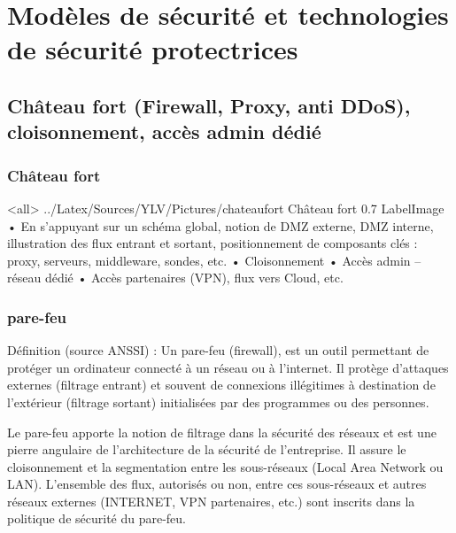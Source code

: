 \section{Modèles de sécurité et technologies de sécurité protectrices}
\subsection{Château fort (Firewall, Proxy, anti DDoS), cloisonnement, accès admin dédié}
\subsubsection{Château fort}


\mode<all>{\picframe
{../Latex/Sources/YLV/Pictures/chateaufort}%
{Château fort} %
{0.7} %
{LabelImage} %
}
•	En s’appuyant sur un schéma global, notion de DMZ externe, DMZ interne, illustration des flux entrant et sortant, positionnement de composants clés : proxy, serveurs, middleware, sondes, etc.
•	Cloisonnement
•	Accès admin – réseau dédié
•	Accès partenaires (VPN), flux vers Cloud, etc.
\subsubsection{pare-feu}
Définition (source ANSSI) :
Un pare-feu (firewall), est un outil permettant de protéger un ordinateur connecté à un réseau ou à l’internet. Il protège d’attaques externes (filtrage entrant) et souvent de connexions illégitimes à destination de l’extérieur (filtrage sortant) initialisées par des programmes ou des personnes.

Le pare-feu apporte la notion de filtrage dans la sécurité des réseaux et est une pierre angulaire de l'architecture de la sécurité de l'entreprise.
Il assure le cloisonnement et la segmentation entre les sous-réseaux (Local Area Network ou LAN).
L'ensemble des flux, autorisés ou non, entre ces sous-réseaux et autres réseaux externes (INTERNET, VPN partenaires, etc.) sont inscrits dans la politique de sécurité du pare-feu.

